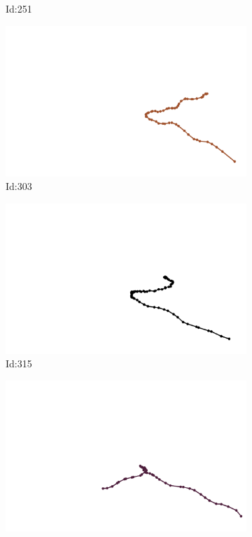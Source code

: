 \documentclass[12pt,twoside]{report}
\begin{document}
\begin{figure}
\begin{subfigure}[b]{0.20\textwidth}
\caption{Id:251}
\end{subfigure}
\begin{subfigure}[b]{0.20\textwidth}
\centering
\includegraphics[width=\textwidth]{../trajectories/303.png}
\caption{Id:303}
\end{subfigure}
\begin{subfigure}[b]{0.20\textwidth}
\centering
\includegraphics[width=\textwidth]{../trajectories/315.png}
\caption{Id:315}
\end{subfigure}
\begin{subfigure}[b]{0.20\textwidth}
\centering
\includegraphics[width=\textwidth]{../trajectories/337.png}

\end{subfigure}
\end{figure}
\end{document}

